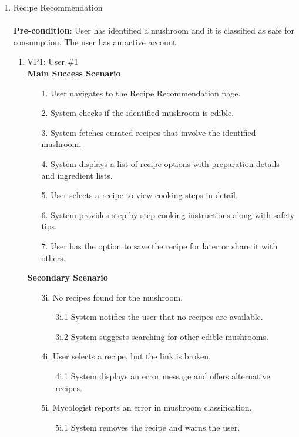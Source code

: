 \documentclass{article}
\begin{document}
\begin{enumerate}[{\bf BE1.}]
		\item Recipe Recommendation \\
		\\
		\textbf{Pre-condition}: User has identified a mushroom and it is classified as safe for consumption. The user has an active account.
		\begin{enumerate}[{\bf VP1.}]
			\item VP1: User \#1 \\
		\textbf{Main Success Scenario} 
			\begin{enumerate}
				\item[1.] User navigates to the Recipe Recommendation page.
				\item[2.] System checks if the identified mushroom is edible.
				\item[3.] System fetches curated recipes that involve the identified mushroom.
				\item[4.] System displays a list of recipe options with preparation details and ingredient lists.
				\item[5.] User selects a recipe to view cooking steps in detail.
				\item[6.] System provides step-by-step cooking instructions along with safety tips.
				\item[7.] User has the option to save the recipe for later or share it with others.
			\end{enumerate}
			
			\textbf{Secondary Scenario}
			\begin{enumerate}
				\item[3i.] No recipes found for the mushroom.
				\begin{enumerate}
					\item[3i.1] System notifies the user that no recipes are available.
					\item[3i.2] System suggests searching for other edible mushrooms.
				\end{enumerate}
				\item[4i.] User selects a recipe, but the link is broken.
				\begin{enumerate}
					\item[4i.1] System displays an error message and offers alternative recipes.
				\end{enumerate}
				\item[5i.] Mycologist reports an error in mushroom classification.
				\begin{enumerate}
					\item[5i.1] System removes the recipe and warns the user.
				\end{enumerate}
			\end{enumerate}
			

\end{enumerate}
\end{enumerate}
\end{document}
